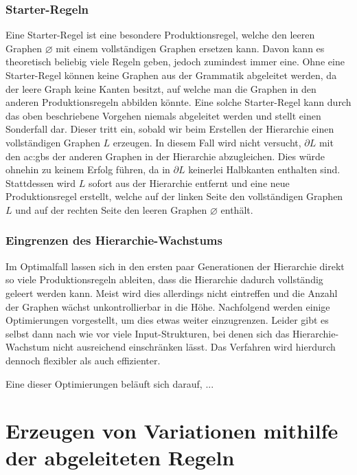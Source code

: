 \subsubsection{Starter-Regeln}
Eine Starter-Regel ist eine besondere Produktionsregel, welche den leeren Graphen \(\varnothing\) mit einem vollständigen Graphen ersetzen kann. Davon
kann es theoretisch beliebig viele Regeln geben, jedoch zumindest immer eine. Ohne eine Starter-Regel können keine Graphen aus der Grammatik abgeleitet werden,
da der leere Graph keine Kanten besitzt, auf welche man die Graphen in den anderen Produktionsregeln abbilden könnte. Eine solche Starter-Regel kann durch
das oben beschriebene Vorgehen niemals abgeleitet werden und stellt einen Sonderfall dar. Dieser tritt ein, sobald wir beim Erstellen der Hierarchie
einen vollständigen Graphen \(L\) erzeugen. In diesem Fall wird nicht versucht, \(\partial L\) mit den \gls{ac:gbs} der anderen Graphen in der Hierarchie
abzugleichen. Dies würde ohnehin zu keinem Erfolg führen, da in \(\partial L\) keinerlei Halbkanten enthalten sind. Stattdessen wird \(L\) sofort aus der
Hierarchie entfernt und eine neue Produktionsregel erstellt, welche auf der linken Seite den vollständigen Graphen \(L\) und auf der rechten Seite den
leeren Graphen \(\varnothing\) enthält.

\subsubsection{Eingrenzen des Hierarchie-Wachstums}
Im Optimalfall lassen sich in den ersten paar Generationen der Hierarchie direkt so viele Produktionsregeln ableiten, dass die Hierarchie dadurch vollständig
geleert werden kann. Meist wird dies allerdings nicht eintreffen und die Anzahl der Graphen wächst unkontrollierbar in die Höhe. Nachfolgend werden einige
Optimierungen vorgestellt, um dies etwas weiter einzugrenzen. Leider gibt es selbst dann nach wie vor viele Input-Strukturen, bei denen sich das
Hierarchie-Wachstum nicht ausreichend einschränken lässt. Das Verfahren wird hierdurch dennoch flexibler als auch effizienter.

Eine dieser Optimierungen beläuft sich darauf, ... %


\section{Erzeugen von Variationen mithilfe der abgeleiteten Regeln}
